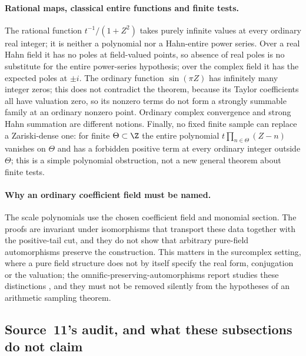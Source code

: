 \documentclass[11pt]{article}
\theoremstyle{plain}
\theoremstyle{plain}
\theoremstyle{plain}
\theoremstyle{definition}
\theoremstyle{definition}
\theoremstyle{definition}
\theoremstyle{definition}
\theoremstyle{remark}
\begin{document}
\paragraph{Rational maps, classical entire functions and finite tests.} The
rational function $t^{-1}/(1+Z^2)$ takes purely infinite values at every
ordinary real integer; it is neither a polynomial nor a Hahn-entire power
series. Over a real Hahn field it has no poles at field-valued points, so
absence of real poles is no substitute for the entire power-series hypothesis;
over the complex field it has the expected poles at $\pm i$. The ordinary
function $\sin(\pi Z)$ has infinitely many integer zeros; this does not
contradict the theorem, because its Taylor coefficients all have valuation
zero, so its nonzero terms do not form a strongly summable family at an
ordinary nonzero point. Ordinary complex convergence and strong Hahn summation
are different notions. Finally, no fixed finite sample can replace a
Zariski-dense one: for finite $\Theta\subset\Z$ the entire polynomial
$t\prod_{n\in\Theta}(Z-n)$ vanishes on $\Theta$ and has a forbidden positive
term at every ordinary integer outside $\Theta$; this is a simple polynomial
obstruction, not a new general theorem about finite tests.

\paragraph{Why an ordinary coefficient field must be named.} The scale
polynomials use the chosen coefficient field and monomial section. The proofs
are invariant under isomorphisms that transport these data together with the
positive-tail cut, and they do not show that arbitrary pure-field automorphisms
preserve the construction. This matters in the surcomplex setting, where a
pure field structure does not by itself specify the real form, conjugation or
the valuation; the omnific-preserving-automorphisms report studies these
distinctions \cite{RepoOPA}, and they must not be removed silently from the
hypotheses of an arithmetic sampling theorem.

\subsection{Source~11's audit, and what these subsections do not claim}
\label{ent:as:subsec:limits}
\end{document}
